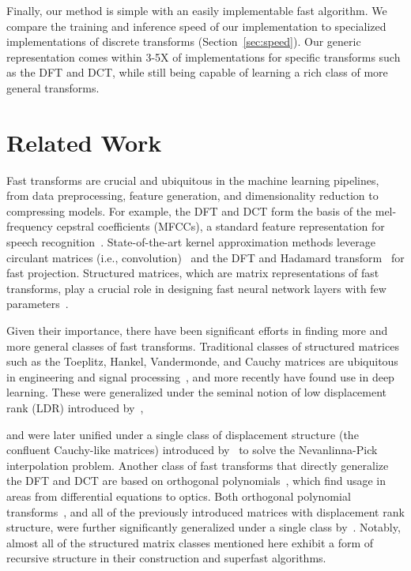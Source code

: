 Finally, our method is simple with an easily implementable fast algorithm. We compare the training and inference speed of our implementation to specialized implementations of discrete transforms (Section~\ref{sec:speed}).
Our generic representation comes within 3-5X of implementations for specific transforms such as the DFT and DCT, while still being capable of learning a rich class of more general transforms.

\section{Related Work}
\label{sec:related_work}

Fast transforms are crucial and ubiquitous in the machine learning pipelines, from data preprocessing, feature generation, and dimensionality reduction to compressing models. For example, the DFT and DCT form the basis of the mel-frequency cepstral coefficients (MFCCs), a standard feature representation for speech recognition~\citep{jurafsky2014speech}. State-of-the-art kernel approximation methods leverage circulant matrices (i.e., convolution)~\citep{yu15} and the DFT and Hadamard
transform~\citep{pmlr-v28-le13, yu2016orthogonal} for fast projection. Structured matrices, which are matrix representations of fast transforms, play a crucial role in designing fast neural network layers with few
parameters~\citep{sindhwani2015structured, ding2017circnn}.

Given their importance, there have been significant efforts in finding more and more general classes of fast transforms. Traditional classes of structured matrices such as the Toeplitz, Hankel, Vandermonde, and Cauchy matrices are ubiquitous in engineering and signal processing~\citep{pan-book}, and more recently have found use in deep learning. These were generalized under the seminal notion of low displacement rank (LDR) introduced by~\citet{kailath1979displacement},

  and were later unified under a single class of displacement structure (the confluent Cauchy-like matrices) introduced by~\citet{OS00} to solve the Nevanlinna-Pick interpolation problem. Another class of fast transforms that directly generalize the DFT and DCT are based on orthogonal polynomials~\citep{chihara}, which find usage in areas from differential equations to optics. Both orthogonal polynomial transforms~\citep{driscoll}, and all of the previously introduced matrices with displacement rank structure, were further significantly generalized under a single class by~\citet{desa2018two}.
  Notably, almost all of the structured matrix classes mentioned here exhibit a form of recursive structure in their construction and superfast algorithms.

